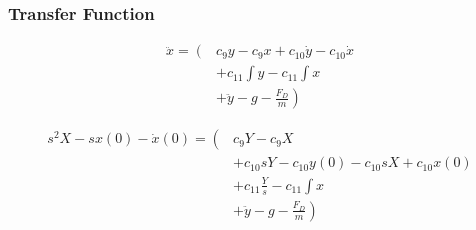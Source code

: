 \subsubsection{Transfer Function}

\begin{align}\nonumber
	\ddot{x} = \left( \right. & c_9 y - c_9 x + c_{10} \dot{y} - c_{10} \dot{x} \\\nonumber
	& + c_{11} \int y - c_{11} \int x \\\nonumber
	& + \left. \ddot{y} - g - \frac{F_D}{m} \right)
\end{align}


\begin{align}\nonumber
	s^2 X - s x(0) - \dot{x}(0) = \left( \right. & c_9 Y - c_9 X \\\nonumber
	& + c_{10} sY - c_{10} y(0) - c_{10} sX + c_{10} x(0) \\\nonumber
	& + c_{11} \frac{Y}{s} - c_{11} \int x \\\nonumber
	& + \left. \ddot{y} - g - \frac{F_D}{m} \right)
\end{align}








